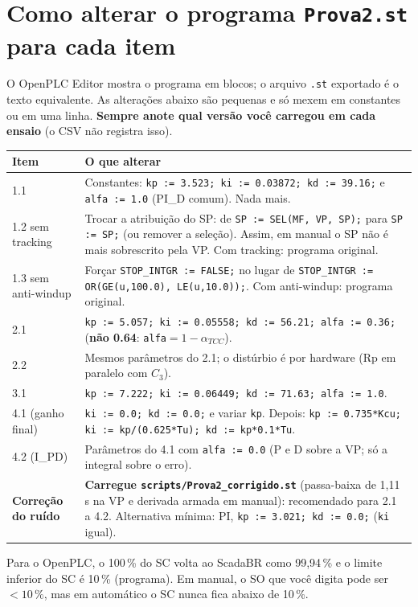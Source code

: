 \documentclass[11pt,a4paper]{article}
\begin{document}
\section{Como alterar o programa \texttt{Prova2.st} para cada item}\label{editarst}
O OpenPLC Editor mostra o programa em blocos; o arquivo \texttt{.st} exportado é o texto equivalente. As alterações abaixo são pequenas e só mexem em constantes ou em uma linha. \textbf{Sempre anote qual versão você carregou em cada ensaio} (o CSV não registra isso).
\begin{center}\small
\begin{longtable}{p{2.1cm}p{13cm}}
\toprule \textbf{Item} & \textbf{O que alterar}\\\midrule\endhead
1.1 & Constantes: \texttt{kp := 3.523; ki := 0.03872; kd := 39.16;} e \texttt{alfa := 1.0} (PI\_D comum). Nada mais.\\
1.2 sem tracking & Trocar a atribuição do SP: de \texttt{SP := SEL(MF, VP, SP);} para \texttt{SP := SP;} (ou remover a seleção). Assim, em manual o SP não é mais sobrescrito pela VP. Com tracking: programa original.\\
1.3 sem anti-windup & Forçar \texttt{STOP\_INTGR := FALSE;} no lugar de \texttt{STOP\_INTGR := OR(GE(u,100.0), LE(u,10.0));}. Com anti-windup: programa original.\\
2.1 & \texttt{kp := 5.057; ki := 0.05558; kd := 56.21; alfa := 0.36;} (\textbf{não 0.64}: \texttt{alfa}$=1-\alpha_{TCC}$).\\
2.2 & Mesmos parâmetros do 2.1; o distúrbio é por hardware (Rp em paralelo com $C_3$).\\
3.1 & \texttt{kp := 7.222; ki := 0.06449; kd := 71.63; alfa := 1.0}.\\
4.1 (ganho final) & \texttt{ki := 0.0; kd := 0.0;} e variar \texttt{kp}. Depois: \texttt{kp := 0.735*Kcu; ki := kp/(0.625*Tu); kd := kp*0.1*Tu}.\\
4.2 (I\_PD) & Parâmetros do 4.1 com \texttt{alfa := 0.0} (P e D sobre a VP; só a integral sobre o erro).\\
\textbf{Correção do ruído} & \textbf{Carregue \texttt{scripts/Prova2\_corrigido.st}} (passa-baixa de 1,11 s na VP e derivada armada em manual): recomendado para 2.1 a 4.2. Alternativa mínima: PI, \texttt{kp := 3.021; kd := 0.0;} (\texttt{ki} igual).\\\bottomrule
\end{longtable}\end{center}
\begin{alerta}Para o OpenPLC, o 100\,\% do SC volta ao ScadaBR como 99,94\,\% e o limite inferior do SC é 10\,\% (programa). Em manual, o SO que você digita pode ser $<10\,\%$, mas em automático o SC nunca fica abaixo de 10\,\%.\end{alerta}
\end{document}
